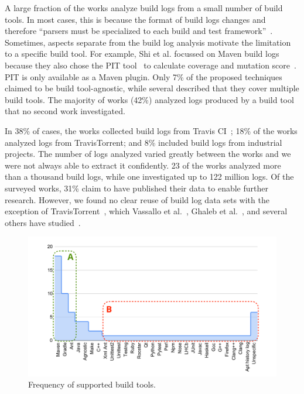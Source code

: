 \documentclass[10pt,journal,compsoc]{IEEEtran}
\begin{document}
A large fraction of the works analyze build logs
from a small number of build tools.
In most cases, this is because the format of build logs
changes and
therefore ``parsers must be specialized to each build and test
framework''~\cite{tomassi2019bugswarm}.
Sometimes, aspects separate from the build log analysis motivate
the limitation to a specific build tool.
For example, Shi et al.
focussed on Maven
build logs because they also chose the PIT tool~\cite{coles2016pit}
to calculate coverage
and mutation score~\cite{shi2018evaluating}.
PIT is only available as a Maven plugin.
Only 7\% of the proposed techniques claimed to be
build tool-agnostic, while
several described that they cover multiple build tools.
The majority of works (42\%) analyzed logs produced by a build tool
that no second work investigated.

In 38\% of cases, the works collected build logs from Travis
CI~\cite{travisci2019webpage};
18\% of the works analyzed logs from TravisTorrent; and 8\% included
build logs from industrial projects.
The number of logs analyzed varied greatly between the works
and we were not always able to
extract it confidently.
23 of the works analyzed more than a thousand build logs, while one
investigated up to 122 million logs.
Of the surveyed works, 31\% claim to have published their data to
enable further research.
However, we found no clear reuse of build log data sets with the
exception of TravisTorrent~\cite{beller2017travistorrent}, which
Vassallo et al.~\cite{vassallo2017a-tale},
Ghaleb et al.~\cite{ghaleb2019studying},
and several others have studied~\cite{hassan2017change,
hassan2019tackling,hassan2017automatic,orellana2017differences,
haghighatkhah2018test,madeyski2017continuous,ghaleb2019empirical,
santolucito2018statically,gallaba2018noise,shi2018evaluating}.

\begin{figure}[tbp]
		\centering
		\includegraphics[width=\columnwidth, trim={1.5cm 0.4cm
		1.5cm 0.5cm},
		clip]{img/lit-sur/log_producer_annotated.pdf}
		\caption{Frequency of supported build tools.}
		\label{fig:litsur:log_producer}
\end{figure}
\end{document}

